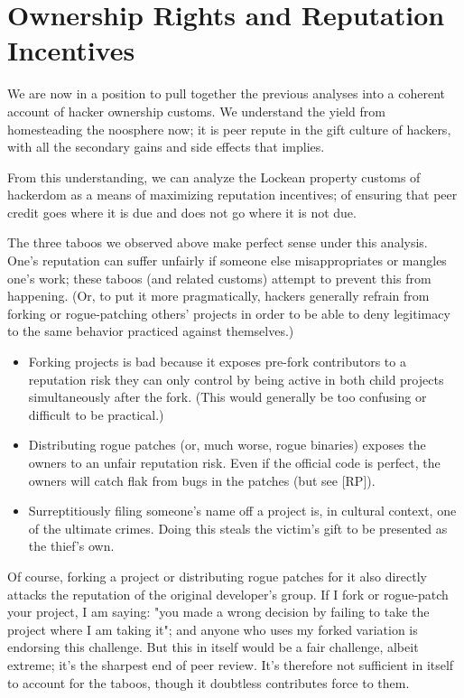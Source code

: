 \section{Ownership Rights and Reputation Incentives}

We are now in a position to pull together the previous analyses into a coherent
account of hacker ownership customs.  We understand the yield from homesteading
the noosphere now; it is peer repute in the gift culture of hackers, with all
the secondary gains and side effects that implies.

From this understanding, we can analyze the Lockean property customs of
hackerdom as a means of maximizing reputation incentives; of ensuring that peer
credit goes where it is due and does not go where it is not due.

The three taboos we observed above make perfect sense under this analysis.
One's reputation can suffer unfairly if someone else misappropriates or mangles
one's work; these taboos (and related customs) attempt to prevent this from
happening.  (Or, to put it more pragmatically, hackers generally refrain from
forking or rogue-patching others' projects in order to be able to deny
legitimacy to the same behavior practiced against themselves.)

\begin{itemize}
\item Forking projects is bad because it exposes pre-fork contributors to a
  reputation risk they can only control by being active in both child projects
  simultaneously after the fork.  (This would generally be too confusing or
  difficult to be practical.)
\item Distributing rogue patches (or, much worse, rogue binaries) exposes the
  owners to an unfair reputation risk.  Even if the official code is perfect,
  the owners will catch flak from bugs in the patches (but see [RP]).
\item Surreptitiously filing someone's name off a project is, in cultural
  context, one of the ultimate crimes.  Doing this steals the victim's gift to
  be presented as the thief's own.
\end{itemize}

Of course, forking a project or distributing rogue patches for it also directly
attacks the reputation of the original developer's group.  If I fork or
rogue-patch your project, I am saying: "you made a wrong decision by failing to
take the project where I am taking it"; and anyone who uses my forked variation
is endorsing this challenge.  But this in itself would be a fair challenge,
albeit extreme; it's the sharpest end of peer review.  It's therefore not
sufficient in itself to account for the taboos, though it doubtless contributes
force to them.

